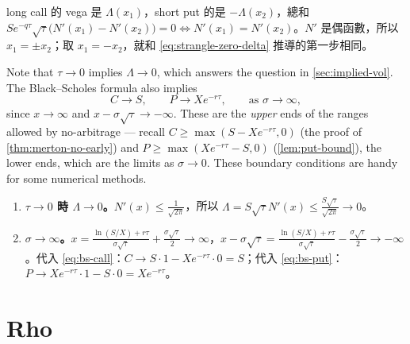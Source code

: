 \begin{remark}[補充]
	long call 的 vega 是 $\Lambda(x_{1})$，short put 的是 $-\Lambda(x_{2})$，總和 $Se^{-q\tau}\sqrt{\tau}\bigl(N'(x_{1})-N'(x_{2})\bigr)=0\iff N'(x_{1})=N'(x_{2})$。$N'$ 是偶函數，所以 $x_{1}=\pm x_{2}$；取 $x_{1}=-x_{2}$，就和 \eqref{eq:strangle-zero-delta} 推導的第一步相同。
\end{remark}
\suppend


Note that $\tau\to0$ implies $\Lambda\to0$, which answers the question in \autoref{sec:implied-vol}.
The Black--Scholes formula also implies
\[
	C\to S , \qquad P\to Xe^{-r\tau} , \qquad\text{as }\sigma\to\infty ,
\]
\suppstart
since $x\to\infty$ and $x-\sigma\sqrt{\tau}\to-\infty$.
These are the \emph{upper} ends of the ranges allowed by no-arbitrage --- recall $C\ge\max(S-Xe^{-r\tau},0)$ (the proof of \autoref{thm:merton-no-early}) and $P\ge\max(Xe^{-r\tau}-S,0)$ (\autoref{lem:put-bound}), the lower ends, which are the limits as $\sigma\to0$.
\suppend
These boundary conditions are handy for some numerical methods.

\suppstart
{}

\begin{remark}[補充]
	\begin{enumerate}[(1),nosep]
		\item \textbf{$\tau\to0$ 時 $\Lambda\to0$。}$N'(x)\le\frac{1}{\sqrt{2\pi}}$，所以 $\Lambda=S\sqrt{\tau}N'(x)\le\frac{S\sqrt{\tau}}{\sqrt{2\pi}}\to0$。
		\item \textbf{$\sigma\to\infty$。}$x=\frac{\ln(S/X)+r\tau}{\sigma\sqrt{\tau}}+\frac{\sigma\sqrt{\tau}}{2}\to\infty$，$x-\sigma\sqrt{\tau}=\frac{\ln(S/X)+r\tau}{\sigma\sqrt{\tau}}-\frac{\sigma\sqrt{\tau}}{2}\to-\infty$。代入 \eqref{eq:bs-call}：$C\to S\cdot1-Xe^{-r\tau}\cdot0=S$；代入 \eqref{eq:bs-put}：$P\to Xe^{-r\tau}\cdot1-S\cdot0=Xe^{-r\tau}$。
	\end{enumerate}
\end{remark}
\suppend

\section{Rho}
\label{sec:rho}

